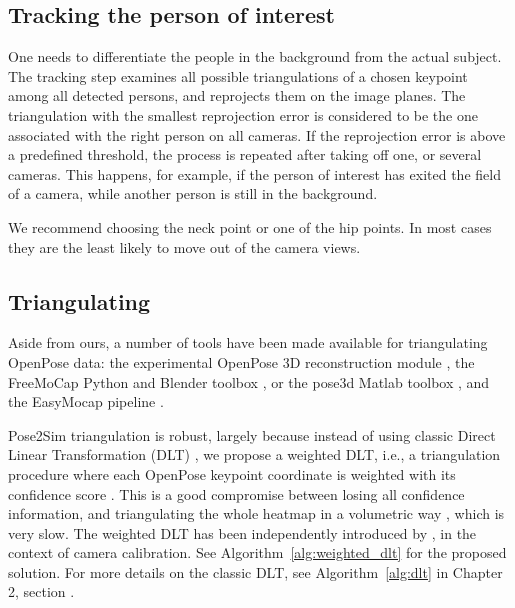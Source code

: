 \subsection{Tracking the person of interest}\label{tracking}

One needs to differentiate the people in the background from the actual subject. The tracking step examines all possible triangulations of a chosen keypoint among all detected persons, and reprojects them on the image planes. The triangulation with the smallest reprojection error is considered to be the one associated with the right person on all cameras. If the reprojection error is above a predefined threshold, the process is repeated after taking off one, or several cameras. This happens, for example, if the person of interest has exited the field of a camera, while another person is still in the background.

We recommend choosing the neck point or one of the hip points. In most cases they are the least likely to move out of the camera views.


\subsection{Triangulating}

Aside from ours, a number of tools have been made available for triangulating OpenPose data: the experimental OpenPose 3D reconstruction module \cite{Hidalgo2021}, the FreeMoCap Python and Blender toolbox \cite{Matthis2022}, or the pose3d Matlab toolbox \cite{Sheshadri2020}, and the EasyMocap pipeline \cite{Easymocap2021}. 

Pose2Sim triangulation is robust, largely because instead of using classic Direct Linear Transformation (DLT) \cite{Hartley1997}, we propose a weighted DLT, i.e., a triangulation procedure where each OpenPose keypoint coordinate is weighted with its confidence score \cite{Pagnon2021}. This is a good compromise between losing all confidence information, and triangulating the whole heatmap in a volumetric way \cite{Iskakov2019}, which is very slow. The weighted DLT has been independently introduced by \cite{Barone2020}, in the context of camera calibration. See Algorithm~\ref{alg:weighted_dlt} for the proposed solution. For more details on the classic DLT, see Algorithm~\ref{alg:dlt} in Chapter 2, section .

